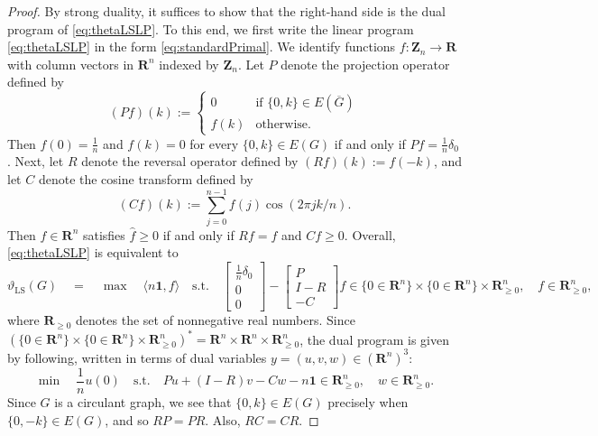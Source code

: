 \documentclass[]{spie}  %
\begin{document}
\begin{proof}
By strong duality, it suffices to show that the right-hand side is the dual program of \eqref{eq:thetaLSLP}.
To this end, we first write the linear program \eqref{eq:thetaLSLP} in the form \eqref{eq:standardPrimal}.  We identify functions $f\colon\mathbf{Z}_n \rightarrow \mathbf{R}$ with column vectors in $\mathbf{R}^n$ indexed by $\mathbf{Z}_n$.  Let $P$ denote the projection operator defined by
\[
(Pf)(k) 
:= \left\{\begin{array}{cl} 0 &  \text{if } \{0,k\}\in E(\overline{G}) \\ f(k) & \text{otherwise.} \end{array}\right.
\]
Then $f(0)=\frac{1}{n}$ and $f(k) = 0$ for every $\{0,k\}\in E(G)$ if and only if $Pf = \frac{1}{n}\delta_0$.
Next, let $R$ denote the reversal operator defined by $(Rf)(k) := f(-k)$, and let $C$ denote the cosine transform defined by
\[
(Cf)(k) 
:= \sum_{j = 0}^{n - 1} f(j) \cos(2\pi j k / n).
\]
Then $f\in\mathbf{R}^n$ satisfies $\widehat{f} \geq 0$ if and only if $Rf = f$ and $Cf \geq 0$.
Overall, \eqref{eq:thetaLSLP} is equivalent to
\[
\vartheta_{\operatorname{LS}}(G)
\quad
=
\quad
\operatorname{max}
\quad
\langle n \mathbf{1}, f \rangle
\quad
\text{s.t.}
\quad
\left[\begin{array}{c}\frac{1}{n} \delta_0 \\ 0 \\ 0\end{array}\right] - \left[\begin{array}{c} P \\ I-R \\ -C \end{array}\right]f \in \{0 \in \mathbf{R}^n\} \times \{0 \in \mathbf{R}^n\} \times \mathbf{R}^n_{\geq 0},
\quad
f \in \mathbf{R}_{\geq 0}^n,
\]
where $\mathbf{R}_{\geq 0}$ denotes the set of nonnegative real numbers.
Since $(\{0 \in \mathbf{R}^n\} \times \{0 \in \mathbf{R}^n\} \times \mathbf{R}^n_{\geq 0})^*=\mathbf{R}^n\times\mathbf{R}^n\times\mathbf{R}_{\geq 0}^n$, the dual program is given by following, written in terms of dual variables $y=(u,v,w)\in(\mathbf{R}^n)^3$:
\begin{equation}\label{eq:dual1}
\operatorname{min}
\quad
\frac{1}{n} u(0)
\quad
\text{s.t.}
\quad
Pu + (I-R)v - Cw - n\mathbf{1} \in \mathbf{R}^n_{\geq 0},
\quad
w \in \mathbf{R}^n_{\geq 0}.
\end{equation}
Since $G$ is a circulant graph, we see that $\{0,k\}\in E(G)$ precisely when $\{0,-k\}\in E(G)$, and so $RP = PR$.
Also, $RC = CR$.

\end{proof}
\end{document}
